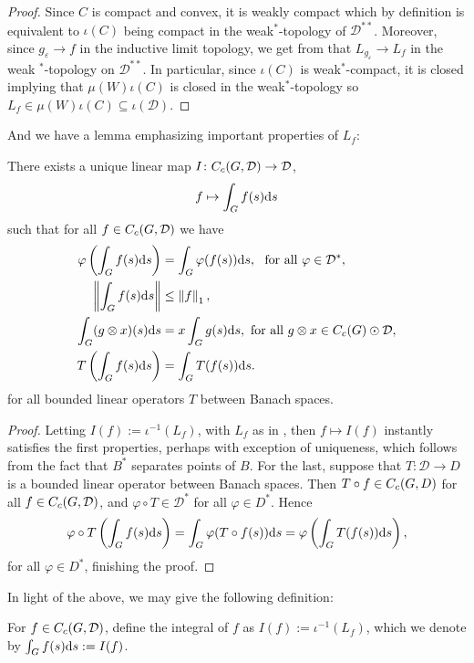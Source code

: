 \begin{proof}
Since $C$ is compact and convex, it is weakly compact which by definition is equivalent to $\iota(C)$ being compact in the weak$^*$-topology of $\mathcal{D}^{**}$. Moreover, since $g_{\varepsilon} \to f$ in the inductive limit topology, we get from  that $L_{g_\varepsilon } \to L_f$ in the weak $^*$-topology on $\mathcal{D}^{**}$. In particular, since $\iota(C)$ is weak$^*$-compact, it is closed implying that $\mu(W) \iota(C)$ is closed in the weak$^*$-topology so $L_f \in \mu(W) \iota(C) \subseteq \iota(\mathcal{D})$.
\end{proof}
And we have a lemma emphasizing important properties of $L_f$:
\begin{lemma}
There exists a unique linear map $I \colon C_c(G,\mathcal{D}) \to \mathcal{D}$,
\begin{align*}
f \mapsto \int_G f(s) \mathrm{d} s
\end{align*}
such that for all $f \in C_c(G,\mathcal{D})$ we have
\begin{align}
\varphi\left(\int_G f(s) \mathrm{d} s \right) &= \int_G \varphi(f(s)) \mathrm{d} s, \ \text{ for all } \varphi \in \mathcal{D}^*,\\
\left\lVert \int_G f(s) \mathrm{d} s \right\rVert &\leq \left\lVert f \right\rVert_1, \\
\int_G (g \otimes x) (s) \mathrm{d} s &=x \int_G g(s) \mathrm{d} s, \text{ for all } g \otimes x \in C_c(G) \odot \mathcal{D}, \\
T\left( \int_G f(s) \mathrm{d} s \right) &= \int_G T(f(s)) \mathrm{d} s.
\end{align}
for all bounded linear operators $T$ between Banach spaces.
\label{int:bochnerproperties}
\end{lemma}
\begin{proof}
Letting $I(f) := \iota^{-1}(L_f)$, with $L_f$ as in , then $f \mapsto I(f)$ instantly satisfies the first properties, perhaps with exception of uniqueness, which follows from the fact that $B^*$ separates points of $B$. For the last, suppose that $T \colon \mathcal{D} \to D$ is a bounded linear operator between Banach spaces. Then $T \circ f \in C_c(G,D)$ for all $f \in C_c(G,\mathcal{D})$, and $\varphi \circ T \in \mathcal{D}^*$ for all $ \varphi \in D^*$. Hence 
\begin{align*}
	\varphi \circ T \left( \int_G f(s) \mathrm{d} s  \right) = \int_G \varphi( T \circ f (s) ) \mathrm{d} s = \varphi \left( \int_G T (f(s)) \mathrm{d} s \right),
\end{align*}
for all $\varphi \in D^*$, finishing the proof.
\end{proof}
In light of the above, we may give the following definition:
\begin{definition}
For $f \in C_c(G,\mathcal{D})$, define the integral of $f$ as $I(f) := \iota^{-1}(L_f)$, which we denote by $\int_G f(s) \mathrm{d} s := I(f)$.
\end{definition}


